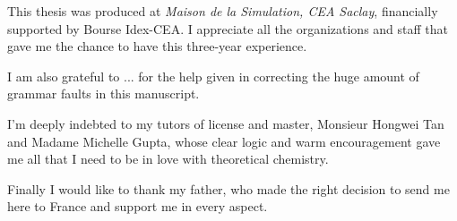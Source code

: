 This thesis was produced at \textit{Maison de la Simulation, CEA Saclay},
financially supported by Bourse Idex-CEA. I appreciate all the
organizations and staff that gave me the chance to have this three-year
experience.

I am also grateful to ... for the help given in correcting the huge amount of
grammar faults in this manuscript.

I'm deeply indebted to my tutors of license and master, Monsieur Hongwei
Tan and Madame Michelle Gupta, whose clear logic and warm encouragement
gave me all that I need to be in love with theoretical chemistry.

Finally I would like to thank my father, who made the right decision
to send me here to France and support me in every aspect.

\endgroup
